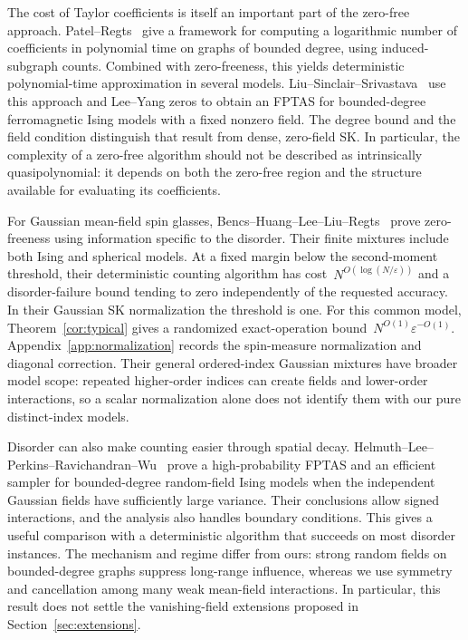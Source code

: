 \documentclass[10pt]{article}
\theoremstyle{plain}
\theoremstyle{definition}
\theoremstyle{remark}
\begin{document}
The cost of Taylor coefficients is itself an important part of the zero-free approach. Patel--Regts~\cite{PR17} give a framework for computing a logarithmic number of coefficients in polynomial time on graphs of bounded degree, using induced-subgraph counts. Combined with zero-freeness, this yields deterministic polynomial-time approximation in several models. Liu--Sinclair--Srivastava~\cite{LSS19} use this approach and Lee--Yang zeros to obtain an FPTAS for bounded-degree ferromagnetic Ising models with a fixed nonzero field. The degree bound and the field condition distinguish that result from dense, zero-field SK. In particular, the complexity of a zero-free algorithm should not be described as intrinsically quasipolynomial: it depends on both the zero-free region and the structure available for evaluating its coefficients.

For Gaussian mean-field spin glasses, Bencs--Huang--Lee--Liu--Regts~\cite[Theorems~1.1--1.2]{BHL+25} prove zero-freeness using information specific to the disorder. Their finite mixtures include both Ising and spherical models. At a fixed margin below the second-moment threshold, their deterministic counting algorithm has cost~$N^{O(\log(N/\varepsilon))}$ and a disorder-failure bound tending to zero independently of the requested accuracy. In their Gaussian SK normalization the threshold is one. For this common model, Theorem~\ref{cor:typical} gives a randomized exact-operation bound~$N^{O(1)}\varepsilon^{-O(1)}$. Appendix~\ref{app:normalization} records the spin-measure normalization and diagonal correction. Their general ordered-index Gaussian mixtures have broader model scope: repeated higher-order indices can create fields and lower-order interactions, so a scalar normalization alone does not identify them with our pure distinct-index models.

Disorder can also make counting easier through spatial decay. Helmuth--Lee--Perkins--Ravichandran--Wu~\cite{HLP+23} prove a high-probability FPTAS and an efficient sampler for bounded-degree random-field Ising models when the independent Gaussian fields have sufficiently large variance. Their conclusions allow signed interactions, and the analysis also handles boundary conditions. This gives a useful comparison with a deterministic algorithm that succeeds on most disorder instances. The mechanism and regime differ from ours: strong random fields on bounded-degree graphs suppress long-range influence, whereas we use symmetry and cancellation among many weak mean-field interactions. In particular, this result does not settle the vanishing-field extensions proposed in Section~\ref{sec:extensions}.
\end{document}
